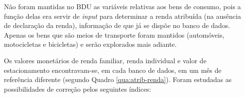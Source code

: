 \begin{table}[htb]

\end{table}


Não foram mantidas no BDU as variáveis relativas aos bens de consumo, pois a função delas era servir de \emph{input} para determinar a renda atribuída (na ausência de declaração da renda), informação de que já se dispõe no banco de dados. Apenas os bens que são meios de transporte foram mantidos (automóveis, motocicletas e bicicletas) e serão explorados mais adiante.

Os valores monetários de renda familiar, renda individual e valor de estacionamento encontravam-se, em cada banco de dados, em um mês de referência diferente (segundo Quadro \ref{qua:atrib-renda}). Foram estudadas as possibilidades de correção pelos seguintes índices:


